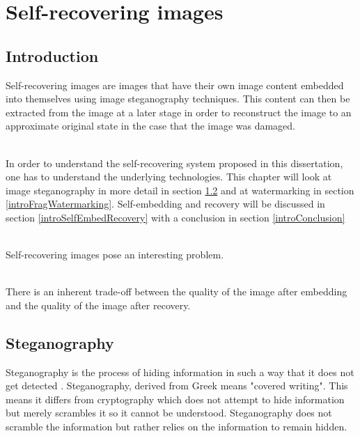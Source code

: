 \documentclass[12pt]{article}
\begin{document}
\section{Self-recovering images}

\subsection{Introduction}
Self-recovering images are images that have their own image content embedded into themselves using image steganography techniques. 
This content can then be extracted from the image at a later stage in order to reconstruct the image to an approximate original state in the case that the image was damaged.

\hspace{0pt} \\
In order to understand the self-recovering system proposed in this dissertation, one has to understand the underlying technologies.  This chapter will look at image steganography in more detail in section \ref{introSteganography} and at watermarking in section \ref{introFragWatermarking}. Self-embedding and recovery will be discussed in section \ref{introSelfEmbedRecovery} with a conclusion in section \ref{introConclusion}

\hspace{0pt} \\
Self-recovering images pose an interesting problem.

\hspace{0pt} \\
There is an inherent trade-off between the quality of the image after embedding and the quality of the image after recovery.

\subsection{Steganography}
\label{introSteganography}
Steganography is the process of hiding information in such a way that it does not get detected \cite{johnson1998exploring}.
Steganography, derived from Greek means "covered writing".
This means it differs from cryptography which does not attempt to hide information but merely scrambles it so it cannot be understood.
Steganography does not scramble the information but rather relies on the information to remain hidden.
\end{document}
